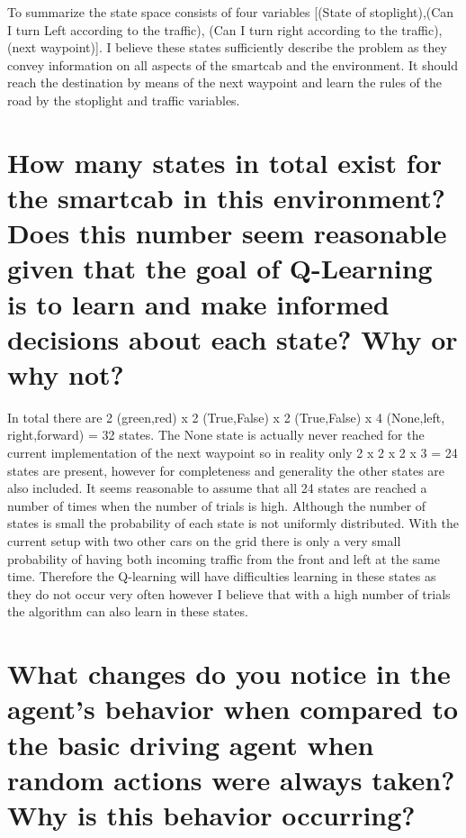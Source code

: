 \documentclass{article}
\begin{document}
To summarize the state space consists of four variables [(State of stoplight),(Can I turn Left according to the traffic), (Can I turn right according to the traffic), (next waypoint)]. I believe these states sufficiently describe the problem as they convey information on all aspects of the smartcab and the environment. It should reach the destination by means of the next waypoint and learn the rules of the road by the stoplight and traffic variables. 

\section*{How many states in total exist for the smartcab in this environment? Does this number seem reasonable given that the goal of Q-Learning is to learn and make informed decisions about each state? Why or why not?}

In total there are 2 (green,red) x 2 (True,False) x 2 (True,False) x 4 (None,left, right,forward) = 32 states. The None state is actually never reached for the current implementation of the next waypoint so in reality only 2 x 2 x 2 x 3 = 24 states are present, however for completeness and generality the other states are also included. It seems reasonable to assume that all 24 states are reached a number of times when the number of trials is high. Although the number of states is small the probability of each state is not uniformly distributed. With the current setup with two other cars on the grid there is only a very small probability of having both incoming traffic from the front and left at the same time. Therefore the Q-learning will have difficulties learning in these states as they do not occur very often however I believe that with a high number of trials the algorithm can also learn in these states.

\section*{What changes do you notice in the agent's behavior when compared to the basic driving agent when random actions were always taken? Why is this behavior occurring?}
\end{document}
